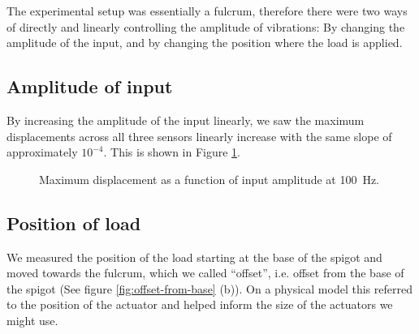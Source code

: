 The experimental setup was essentially a fulcrum, therefore there were two ways of directly and linearly controlling the amplitude of vibrations: By changing the amplitude of the input, and by changing the position where the load is applied.

\subsection{Amplitude of input}
By increasing the amplitude of the input linearly, we saw the maximum displacements across all three sensors linearly increase with the same slope of approximately $ 10^{-4} $.
This is shown in Figure \ref{fig:max_displacement-input_amplitude}.

\begin{figure}[h] \centering
\caption[Maximum displacement as a function of input amplitude]{Maximum displacement as a function of input amplitude at \SI{100}{Hz}.}
\label{fig:max_displacement-input_amplitude}
\end{figure}

\subsection{Position of load}
We measured the position of the load starting at the base of the spigot and moved towards the fulcrum, which we called ``offset'', i.e. offset from the base of the spigot (See figure \ref{fig:offset-from-base} (b)).
On a physical model this referred to the position of the actuator and helped inform the size of the actuators we might use.

